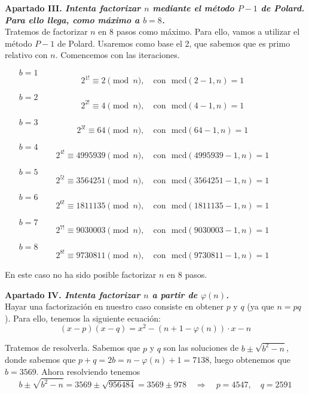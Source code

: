 \documentclass[fleqn]{article}
\def\next{\quad \Rightarrow \quad}
\begin{document}
    \newpage
    \textbf{Apartado III. \textit{Intenta factorizar $n$ mediante el método $P-1$ de Polard. Para ello llega, como máximo a $b=8$.}}\\
    Tratemos de factorizar $n$ en 8 pasos como máximo. Para ello, vamos a utilizar el método $P-1$ de Polard. Usaremos como base el 2, 
    que sabemos que es primo relativo con $n$. Comencemos con las iteraciones.
    \begin{enumerate}
        \item[$b=1$] $$2^{1!} \equiv 2 \pmod{n}, \quad \text{con }\text{ mcd}(2-1,n) = 1$$
        \item[$b=2$] $$2^{2!} \equiv 4 \pmod{n}, \quad \text{con }\text{ mcd}(4-1,n) = 1$$
        \item[$b=3$] $$2^{3!} \equiv 64 \pmod{n}, \quad \text{con }\text{ mcd}(64-1,n) = 1$$
        \item[$b=4$] $$2^{4!} \equiv 4995939 \pmod{n}, \quad \text{con }\text{ mcd}(4995939-1,n) = 1$$
        \item[$b=5$] $$2^{5!} \equiv 3564251 \pmod{n}, \quad \text{con }\text{ mcd}(3564251-1,n) = 1$$
        \item[$b=6$] $$2^{6!} \equiv 1811135 \pmod{n}, \quad \text{con }\text{ mcd}(1811135-1,n) = 1$$
        \item[$b=7$] $$2^{7!} \equiv 9030003 \pmod{n}, \quad \text{con }\text{ mcd}(9030003-1,n) = 1$$
        \item[$b=8$] $$2^{8!} \equiv 9730811 \pmod{n}, \quad \text{con }\text{ mcd}(9730811-1,n) = 1$$
    \end{enumerate}

    En este caso no ha sido posible factorizar $n$ en 8 pasos.


    \newpage
    \textbf{Apartado IV. \textit{Intenta factorizar $n$ a partir de $\varphi(n)$.}}\\
    Hayar una factorización en nuestro caso consiste en obtener $p$ y $q$ (ya que $n = pq$). Para ello, tenemos la siguiente ecuación:
    $$(x-p)(x-q) = x^2 - (n + 1 - \varphi(n)) \cdot x - n$$

    Tratemos de resolverla. Sabemos que $p$ y $q$ son las soluciones de $b \pm \sqrt{b^2 -n}$, donde
    sabemos que $p + q = 2b = n - \varphi(n) + 1 = 7138$, luego obtenemos que $b = 3569$. Ahora resolviendo tenemos
    $$b \pm \sqrt{b^2 -n} = 3569 \pm \sqrt{956484} = 3569 \pm 978 \next p = 4547, \quad q = 2591$$
\end{document}
